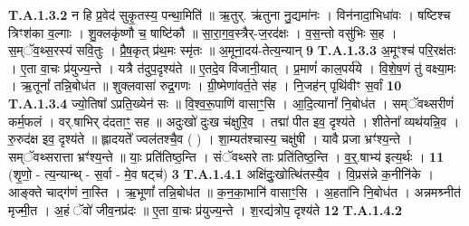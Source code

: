 \documentclass[17pt]{extarticle}
\begin{document}
                                                                  \textbf{ T.A.1.3.2} \newline
                  न हि प्र॒वेद॑ सुकृ॒तस्य॒ पन्था॒मिति॑ ॥  ऋ॒तुर्. ऋ॑तुना नु॒द्यमा॑नः । विन॑नादा॒भिधा॑वः । षष्टिश्च त्रिꣳश॑का व॒ल्गाः ।  शु॒क्लकृ॑ष्णौ च॒ षाष्टि॑कौ ॥  सा॒रा॒ग॒व॒स्त्रैर्-ज॒रद॑क्षः ।  व॒स॒न्तो वसु॑भिः स॒ह । स॒म्ॅव॒थ्स॒रस्य॑ सवि॒तुः । प्रै॒ष॒कृत् प्र॑थ॒मः स्मृ॑तः ॥ अ॒मूना॒दय॑-तेत्य॒न्यान् \textbf{ 9} \newline
                  \newline
                                                                  \textbf{ T.A.1.3.3} \newline
                  अ॒मूꣳश्च॑ परि॒रक्ष॑तः । ए॒ता वा॒चः प्र॑युज्य॒न्ते । यत्रै त॑दुप॒दृश्य॑ते ॥ ए॒तदे॒व वि॑जानी॒यात् । प्र॒माणं॑ काल॒पर्य॑ये । वि॒शे॒ष॒णं तु॑ वक्ष्या॒मः । ऋ॒तूनां᳚ तन्नि॒बोध॑त ॥ शुक्लवासा॑ रुद्र॒गणः । ग्री॒ष्मेणा॑वर्त॒ते स॑ह ।  नि॒जह॑न् पृथि॑वीꣳ स॒र्वां \textbf{ 10} \newline
                  \newline
                                                                  \textbf{ T.A.1.3.4} \newline
                  ज्यो॒तिषा᳚ ऽप्रति॒ख्येन॑ सः ॥ वि॒श्व॒रू॒पाणि॑ वासाꣳ॒॒सि । आ॒दि॒त्यानां᳚ नि॒बोध॑त । सम्ॅवथ्सरीणं॑ कर्म॒फलं । वर्.षाभिर् द॑दताꣳ॒॒ सह ॥ अदुःखो॑ दुःख च॑क्षुरि॒व । तद्मा॑ पीत इव॒ दृश्य॑ते । शीतेना᳚ व्यथ॑यन्नि॒व । रु॒रुद॑क्ष इव॒ दृश्य॑ते ॥ ह्लादयते᳚ ज्वल॑तश्चै॒व ( ) ।  शा॒म्यत॑श्चास्य॒ चक्षु॑षी । यावै प्रजा भ्रꣳ॑श्य॒न्ते । सम्ॅवथ्सरात्ता भ्रꣳ॑श्य॒न्ते ॥ याः॒ प्रति॑तिष्ठ॒न्ति । संॅवथ्सरे ताः प्रति॑तिष्ठ॒न्ति । व॒॒र्॒.षाभ्य॑ इत्य॒र्थः । \textbf{ 11} \newline
                  \newline
                                                        (शृ॒णो॒ - त्य॒न्यान्थ् - स॒र्वा - मे॒व षट्च॑) \textbf{3} \newline \newline
                                \textbf{ T.A.1.4.1} \newline
                  अक्षि॑दुः॒खोत्थि॑तस्यै॒व । वि॒प्रस॑न्ने क॒नीनि॑के । आङ्क्ते चाद्ग॑णं ना॒स्ति । ऋ॒भूणां᳚ तन्नि॒बोध॑त ॥ क॒न॒का॒भानि॑ वासाꣳ॒॒सि । अ॒हता॑नि नि॒बोध॑त ।  अन्नमश्र्नीत॑ मृज्मी॒त । अ॒हं ॅवो॑ जीव॒नप्र॑दः ॥ ए॒ता वा॒चः प्र॑युज्य॒न्ते ।  श॒रद्य॑त्रोप॒ दृश्य॑ते \textbf{ 12} \newline
                  \newline
                                                                  \textbf{ T.A.1.4.2} \newline
\end{document}
